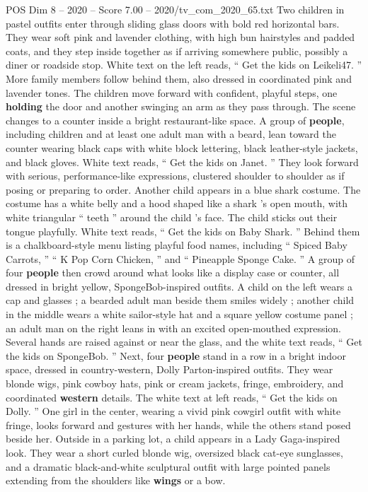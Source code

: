 \begin{textsample}{POS Dim 8 – 2020 – Score 7.00 – 2020/tv\_com\_2020\_65.txt}
Two children in pastel outfits enter through sliding glass doors with bold red horizontal bars.
They wear soft pink and lavender clothing, with high bun hairstyles and padded coats, and they step inside together as if arriving somewhere public, possibly a diner or roadside stop.
White text on the left reads, “ Get the kids on Leikeli47. ” More family members follow behind them, also dressed in coordinated pink and lavender tones.
The children move forward with confident, playful steps, one \textbf{holding} the door and another swinging an arm as they pass through.
The scene changes to a counter inside a bright restaurant-like space.
A group of \textbf{people}, including children and at least one adult man with a beard, lean toward the counter wearing black caps with white block lettering, black leather-style jackets, and black gloves.
White text reads, “ Get the kids on Janet. ” They look forward with serious, performance-like expressions, clustered shoulder to shoulder as if posing or preparing to order.
Another child appears in a blue shark costume.
The costume has a white belly and a hood shaped like a shark ’s open mouth, with white triangular “ teeth ” around the child ’s face.
The child sticks out their tongue playfully.
White text reads, “ Get the kids on Baby Shark. ” Behind them is a chalkboard-style menu listing playful food names, including “ Spiced Baby Carrots, ” “ K Pop Corn Chicken, ” and “ Pineapple Sponge Cake. ” A group of four \textbf{people} then crowd around what looks like a display case or counter, all dressed in bright yellow, SpongeBob-inspired outfits.
A child on the left wears a cap and glasses ; a bearded adult man beside them smiles widely ; another child in the middle wears a white sailor-style hat and a square yellow costume panel ; an adult man on the right leans in with an excited open-mouthed expression.
Several hands are raised against or near the glass, and the white text reads, “ Get the kids on SpongeBob. ” Next, four \textbf{people} stand in a row in a bright indoor space, dressed in country-western, Dolly Parton-inspired outfits.
They wear blonde wigs, pink cowboy hats, pink or cream jackets, fringe, embroidery, and coordinated \textbf{western} details.
The white text at left reads, “ Get the kids on Dolly. ” One girl in the center, wearing a vivid pink cowgirl outfit with white fringe, looks forward and gestures with her hands, while the others stand posed beside her.
Outside in a parking lot, a child appears in a Lady Gaga-inspired look.
They wear a short curled blonde wig, oversized black cat-eye sunglasses, and a dramatic black-and-white sculptural outfit with large pointed panels extending from the shoulders like \textbf{wings} or a bow.

\end{textsample}
